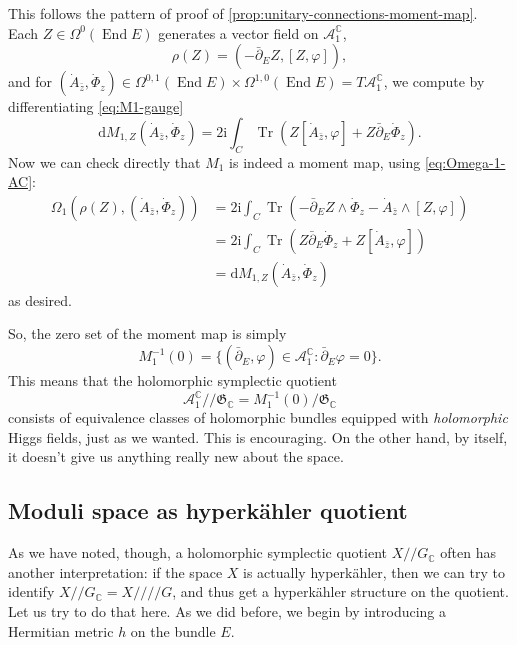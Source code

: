 \documentclass[12pt,letterpaper,reqno]{article}
\numberwithin{equation}{section}
\newcommand{\fG}{{\mathfrak G}}
\newcommand{\cA}{\ensuremath{\mathcal A}}
\newcommand{\C}{\ensuremath{\mathbb C}}
\newcommand{\kq}{/\!\!/}
\newcommand{\hk}{hyperk\"ahler\xspace}
\newcommand{\hkq}{/\!\!/\!\!/\!\!/}
\newcommand{\I}{{\mathrm i}}
\newcommand{\de}{\mathrm{d}}
\newcommand{\ti}[1]{\textit{#1}}
\DeclareMathOperator{\Tr}{Tr}
\DeclareMathOperator{\End}{End}
\begin{document}
\begin{pf} This follows the pattern of proof of \autoref{prop:unitary-connections-moment-map}.
Each $Z \in \Omega^0(\End E)$ generates a vector field on $\cA_1^\C$,
\begin{equation}
  \rho(Z) = (- \bar\partial_E Z, [Z,\varphi]),
\end{equation}
and for
$(\dot A_{\bar z},\dot\Phi_z) \in \Omega^{0,1}(\End E) \times \Omega^{1,0}(\End E) = T\cA_1^\C$,
we compute by differentiating \eqref{eq:M1-gauge}
\begin{equation}
  \de M_{1,Z} (\dot A_{\bar z},\dot\Phi_z) = 2 \I \int_C \Tr( Z [\dot A_{\bar z},\varphi] + Z \bar\partial_E \dot\Phi_z).
\end{equation}
Now we can check directly that $M_1$ is indeed a moment map, using \eqref{eq:Omega-1-AC}:
\begin{align}
  \Omega_1(\rho(Z), (\dot A_{\bar z},\dot\Phi_z)) &= 2 \I \int_C \Tr(- \bar\partial_E Z \wedge \dot\Phi_z - \dot A_{\bar z} \wedge [Z,\varphi]) \\
  &= 2 \I \int_C \Tr(Z \bar\partial_E \dot\Phi_z + Z[\dot A_{\bar z},\varphi]) \\
  &= \de M_{1,Z}(\dot A_{\bar z},\dot\Phi_z)
\end{align}
as desired.
\end{pf}

So, the zero set of the moment map is simply
\begin{equation}
	M_1^{-1}(0) = \{ (\bar\partial_E, \varphi ) \in \cA^\C_1: \bar\partial_E \varphi = 0 \}.
\end{equation}
This means that
the holomorphic symplectic quotient
\begin{equation}
 \cA^\C_1 \kq \fG_\C = M_1^{-1}(0) / \fG_\C
\end{equation}
consists of equivalence classes of holomorphic bundles equipped
with \ti{holomorphic} Higgs fields, just as we wanted.
This is encouraging. On the other hand, by itself, it doesn't
give us anything really new about the space.


\subsection{Moduli space as \hk quotient}

As we have noted, though, a holomorphic symplectic quotient $X \kq G_\C$
often has another interpretation: if the space $X$ is
actually \hk, then we can try to identify $X \kq G_\C = X \hkq G$,
and thus get a \hk structure on the quotient.
Let us try to do that here.
As we did before, we begin by introducing a Hermitian metric $h$ on the
bundle $E$.
\end{document}
